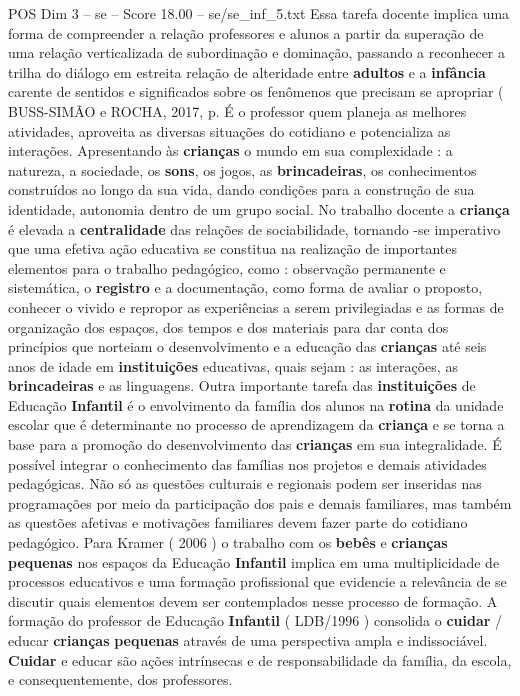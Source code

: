 \begin{textsample}{POS Dim 3 – se – Score 18.00 – se/se\_inf\_5.txt}
Essa tarefa docente implica uma forma de compreender a relação professores e alunos a partir da superação de uma relação verticalizada de subordinação e dominação, passando a reconhecer a trilha do diálogo em estreita relação de alteridade entre \textbf{adultos} e a \textbf{infância} carente de sentidos e significados sobre os fenômenos que precisam se apropriar ( BUSS-SIMÃO e ROCHA, 2017, p.
É o professor quem planeja as melhores atividades, aproveita as diversas situações do cotidiano e potencializa as interações.
Apresentando às \textbf{crianças} o mundo em sua complexidade : a natureza, a sociedade, os \textbf{sons}, os jogos, as \textbf{brincadeiras}, os conhecimentos construídos ao longo da sua vida, dando condições para a construção de sua identidade, autonomia dentro de um grupo social.
No trabalho docente a \textbf{criança} é elevada a \textbf{centralidade} das relações de sociabilidade, tornando -se imperativo que uma efetiva ação educativa se constitua na realização de importantes elementos para o trabalho pedagógico, como : observação permanente e sistemática, o \textbf{registro} e a documentação, como forma de avaliar o proposto, conhecer o vivido e repropor as experiências a serem privilegiadas e as formas de organização dos espaços, dos tempos e dos materiais para dar conta dos princípios que norteiam o desenvolvimento e a educação das \textbf{crianças} até seis anos de idade em \textbf{instituições} educativas, quais sejam : as interações, as \textbf{brincadeiras} e as linguagens.
Outra importante tarefa das \textbf{instituições} de Educação \textbf{Infantil} é o envolvimento da família dos alunos na \textbf{rotina} da unidade escolar que é determinante no processo de aprendizagem da \textbf{criança} e se torna a base para a promoção do desenvolvimento das \textbf{crianças} em sua integralidade.
É possível integrar o conhecimento das famílias nos projetos e demais atividades pedagógicas.
Não só as questões culturais e regionais podem ser inseridas nas programações por meio da participação dos pais e demais familiares, mas também as questões afetivas e motivações familiares devem fazer parte do cotidiano pedagógico.
Para Kramer ( 2006 ) o trabalho com os \textbf{bebês} e \textbf{crianças} \textbf{pequenas} nos espaços da Educação \textbf{Infantil} implica em uma multiplicidade de processos educativos e uma formação profissional que evidencie a relevância de se discutir quais elementos devem ser contemplados nesse processo de formação.
A formação do professor de Educação \textbf{Infantil} ( LDB/1996 ) consolida o \textbf{cuidar} / educar \textbf{crianças} \textbf{pequenas} através de uma perspectiva ampla e indissociável. \textbf{Cuidar} e educar são ações intrínsecas e de responsabilidade da família, da escola, e consequentemente, dos professores.

\end{textsample}
